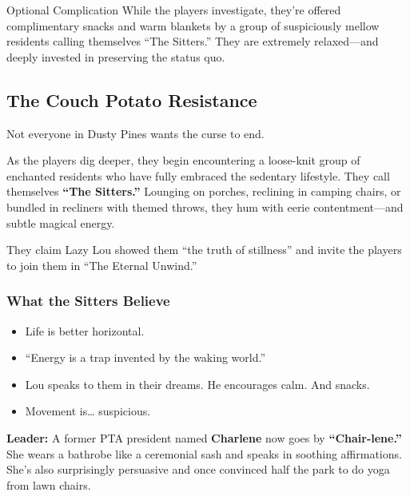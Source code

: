 \begin{CommentBox}{Optional Complication}
    While the players investigate, they’re offered complimentary snacks and warm blankets by a group of suspiciously mellow residents calling themselves “The Sitters.” They are extremely relaxed—and deeply invested in preserving the status quo.
\end{CommentBox}


\subsection{The Couch Potato Resistance}

Not everyone in Dusty Pines wants the curse to end.

As the players dig deeper, they begin encountering a loose-knit group of enchanted residents who have fully embraced the sedentary lifestyle. They call themselves \textbf{“The Sitters.”} Lounging on porches, reclining in camping chairs, or bundled in recliners with themed throws, they hum with eerie contentment—and subtle magical energy.

They claim Lazy Lou showed them “the truth of stillness” and invite the players to join them in “The Eternal Unwind.”

\subsubsection*{What the Sitters Believe}
\begin{itemize}
    \item Life is better horizontal.
    \item “Energy is a trap invented by the waking world.”
    \item Lou speaks to them in their dreams. He encourages calm. And snacks.
    \item Movement is… suspicious.
\end{itemize}

\textbf{Leader:} A former PTA president named \textbf{Charlene} now goes by \textbf{“Chair-lene.”} She wears a bathrobe like a ceremonial sash and speaks in soothing affirmations. She’s also surprisingly persuasive and once convinced half the park to do yoga from lawn chairs.

